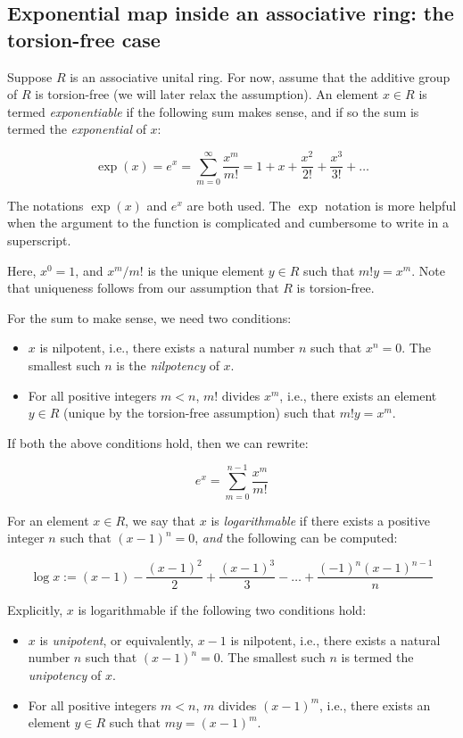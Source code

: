 \subsection{Exponential map inside an associative ring: the torsion-free case}\label{sec:exp-and-log-unital}

Suppose $R$ is an associative unital ring. For now, assume that the
additive group of $R$ is torsion-free (we will later relax the
assumption). An element $x \in R$ is termed {\em exponentiable} if the
following sum makes sense, and if so the sum is termed the {\em
  exponential} of $x$:

$$\exp(x) = e^x = \sum_{m=0}^\infty \frac{x^m}{m!} = 1 + x + \frac{x^2}{2!} + \frac{x^3}{3!} + \dots$$

The notations $\exp(x)$ and $e^x$ are both used. The $\exp$ notation
is more helpful when the argument to the function is complicated and
cumbersome to write in a superscript.

Here, $x^0 = 1$, and $x^m/m!$ is the unique element $y \in R$ such
that $m!y = x^m$. Note that uniqueness follows from our assumption
that $R$ is torsion-free.

For the sum to make sense, we need two conditions:

\begin{itemize}
\item $x$ is nilpotent, i.e., there exists a natural number $n$ such
  that $x^n = 0$. The smallest such $n$ is the {\em nilpotency} of $x$.
\item For all positive integers $m < n$, $m!$ divides $x^m$, i.e.,
  there exists an element $y \in R$ (unique by the torsion-free
  assumption) such that $m!y = x^m$.
\end{itemize}

If both the above conditions hold, then we can rewrite:

$$e^x = \sum_{m=0}^{n - 1} \frac{x^m}{m!}$$

For an element $x \in R$, we say that $x$ is {\em logarithmable} if
there exists a positive integer $n$ such that $(x - 1)^n = 0$, {\em and} the following can be computed:

$$\log x := (x - 1) - \frac{(x - 1)^2}{2} + \frac{(x - 1)^3}{3} - \dots + \frac{(-1)^n(x - 1)^{n-1}}{n}$$

Explicitly, $x$ is logarithmable if the following two conditions hold:

\begin{itemize}
\item $x$ is {\em unipotent}, or equivalently, $x - 1$ is nilpotent,
  i.e., there exists a natural number $n$ such that $(x - 1)^n =
  0$. The smallest such $n$ is termed the {\em unipotency} of $x$.
\item For all positive integers $m < n$, $m$ divides $(x - 1)^m$,
  i.e., there exists an element $y \in R$ such that $my = (x - 1)^m$.
\end{itemize}

